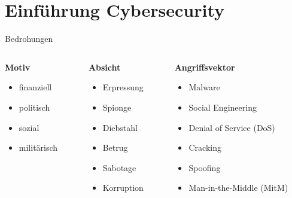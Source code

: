 {
\section{Einführung Cybersecurity}
\begin{frame}
    \centering
    \tableofcontents[currentsection]
\end{frame}

\begin{frame}{Bedrohungen}
    \small
    \begin{columns}

        \begin{column}{0.3\textwidth}
            \textbf{Motiv}
            \begin{itemize}
                \item finanziell
                \item politisch 
                \item sozial 
                \item militärisch
            \end{itemize}
        \end{column}\pause

        \begin{column}{0.3\textwidth}
            \textbf{Absicht}
            \begin{itemize}
                \item Erpressung
                \item Spionge
                \item Diebstahl
                \item Betrug
                \item Sabotage
                \item Korruption
            \end{itemize}
        \end{column}\pause

        \begin{column}{0.3\textwidth}
            \textbf{Angriffsvektor}
            \begin{itemize}
                \item Malware
                \item Social Engineering
                \item Denial of Service (DoS)
                \item Cracking
                \item Spoofing
                \item Man-in-the-Middle (MitM)
            \end{itemize}
        \end{column}


\end{columns}
\end{frame}}

